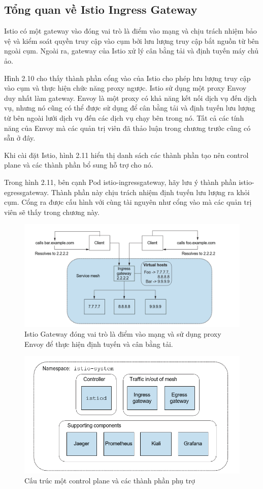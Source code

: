 \documentclass[14pt,a4paper]{book}
\begin{document}
		\subsection{Tổng quan về Istio Ingress Gateway}
		\hspace{0.6cm}Istio có một gateway vào đóng vai trò là điểm vào mạng và chịu trách nhiệm bảo vệ và kiểm soát quyền truy cập vào cụm bởi lưu lượng truy cập bắt nguồn từ bên ngoài cụm. Ngoài ra, gateway của Istio xử lý cân bằng tải và định tuyến máy chủ ảo.
		
		Hình 2.10 cho thấy thành phần cổng vào của Istio cho phép lưu lượng truy cập vào cụm và thực hiện chức năng proxy ngược. Istio sử dụng một proxy Envoy duy nhất làm gateway. Envoy là một proxy có khả năng kết nối dịch vụ đến dịch vụ, nhưng nó cũng có thể được sử dụng để cân bằng tải và định tuyến lưu lượng từ bên ngoài lưới dịch vụ đến các dịch vụ chạy bên trong nó. Tất cả các tính năng của Envoy mà các quản trị viên đã thảo luận trong chương trước cũng có sẵn ở đây.
		
		Khi cài đặt Istio, hình 2.11 hiển thị danh sách các thành phần tạo nên control plane và các thành phần bổ sung hỗ trợ cho nó.
		
		Trong hình 2.11, bên cạnh Pod istio-ingressgateway, hãy lưu ý thành phần istio-egressgateway. Thành phần này chịu trách nhiệm định tuyến lưu lượng ra khỏi cụm. Cổng ra được cấu hình với cùng tài nguyên như cổng vào mà các quản trị viên sẽ thấy trong chương này.
		
		\begin{figure}[h!]
			\centering
			\includegraphics[width=0.6\linewidth]{Pics/2.2.1-p1}
			\caption{Istio Gateway đóng vai trò là điểm vào mạng và sử dụng proxy Envoy để thực hiện định tuyến và cân bằng tải.}
			\label{fig:2.2.1-1}
		\end{figure}
		
		\begin{figure}[h!]
			\centering
			\includegraphics[width=0.7\linewidth]{Pics/2.2.1-p2}
			\caption{Cấu trúc một control plane và các thành phần phụ trợ}
			\label{fig:2.2.1-2}
		\end{figure}
		
\end{document}
